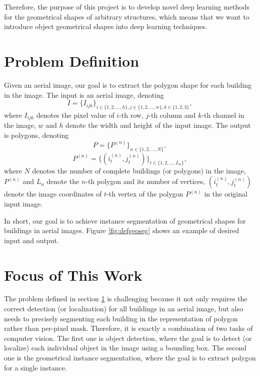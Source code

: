 Therefore, the purpose of this project is to develop novel deep learning methods for the geometrical shapes of arbitrary structures, which means that we want to introduce object geometrical shapes into deep learning techniques.

\section{Problem Definition}\label{prodef}
Given an aerial image, our goal is to extract the polygon shape for each building in the image. The input is an aerial image, denoting 
\begin{equation}
I = \{I_{ijk}\}_{i \in \{1,2,\ldots,h\}, j \in \{1,2,\ldots,w\}, k \in \{1,2,3\}},
\end{equation}
where $I_{ijk}$ denotes the pixel value of $i$-th row, $j$-th column and $k$-th channel in the image, $w$ and $h$ denote the width and height of the input image. The output is polygons, denoting
\begin{equation}
P = \{P^{(n)}\}_{n \in \{1,2,\ldots,N\}},
\end{equation}
\begin{equation}
P^{(n)} = \{(i^{(n)}_t, j^{(n)}_t)\}_{t \in \{1,2,\ldots,L_n\}},
\end{equation}
where $N$ denotes the number of complete buildings (or polygons) in the image, $P^{(n)}$ and $L_n$ denote the $n$-th polygon and its number of vertices, $(i^{(n)}_t, j^{(n)}_t)$ denote the image coordinates of $t$-th vertex of the polygon $P^{(n)}$ in the original input image.

In short, our goal is to achieve instance segmentation of geometrical shapes for buildings in aerial images. Figure \ref{fig:defgeoseg} shows an example of desired input and output.



\section{Focus of This Work}\label{fcswrk}
The problem defined in section \ref{prodef} is challenging because it not only requires the correct detection (or localization) for all buildings in an aerial image, but also needs to precisely segmenting each building in the representation of polygon rather than per-pixel mask. Therefore, it is exactly a combination of two tasks of computer vision. The first one is object detection, where the goal is to detect (or localize) each individual object in the image using a bounding box. The second one is the geometrical instance segmentation, where the goal is to extract polygon for a single instance.

